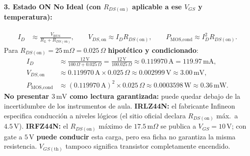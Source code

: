 \documentclass[10pt, a4paper, landscape]{article}
\begin{document}
\paragraph{3. Estado ON No Ideal (con $R_{DS(\text{on})}$ aplicable a ese $V_{GS}$ y temperatura):}
\begin{align}
    I_D &\approx \frac{V_{\text{BUS}}}{R_L + R_{DS(\text{on})}}, \qquad V_{DS,\text{on}} \approx I_D R_{DS(\text{on})}, \qquad P_{\text{MOS,cond}} \approx I_D^2 R_{DS(\text{on})}.
\end{align}
Para $R_{DS(\text{on})} = 25\,\text{m}\Omega = 0.025\,\Omega$ \textbf{hipotético y condicionado}:
\begin{align*}
    I_D &\approx \frac{12\,\text{V}}{100\,\Omega + 0.025\,\Omega} = \frac{12\,\text{V}}{100.025\,\Omega} \approx 0.119970\,\text{A} = 119.97\,\text{mA}, \\
    V_{DS,\text{on}} &\approx 0.119970\,\text{A} \times 0.025\,\Omega \approx 0.002999\,\text{V} \approx 3.00\,\text{mV}, \\
    P_{\text{MOS,cond}} &\approx (0.119970\,\text{A})^2 \times 0.025\,\Omega \approx 0.0003598\,\text{W} \approx 0.36\,\text{mW}.
\end{align*}
\textbf{No presentar $3\,\text{mV}$ como lectura garantizada:} puede quedar debajo de la incertidumbre de los instrumentos de aula. \textbf{IRLZ44N:} el fabricante Infineon especifica conducción a niveles lógicos (el sitio oficial declara $R_{DS(\text{on})}$ máx.\ a $4.5\,\text{V}$). \textbf{IRFZ44N:} el $R_{DS(\text{on})}$ máximo de $17.5\,\text{m}\Omega$ se publica a $V_{GS}=10\,\text{V}$; con gate a $5\,\text{V}$ \textbf{puede conducir} esta carga, pero esa ficha no garantiza la misma resistencia. $V_{GS(\text{th})}$ tampoco significa transistor completamente encendido.
\end{document}
